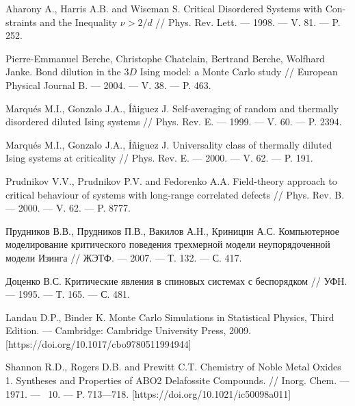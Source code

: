 \begin{thebibliography}{111}
Aharony A., Harris A.B. and Wiseman S. Critical Disordered Systems with Con-straints and the Inequality $\nu > 2/d$  // Phys. Rev. Lett. --- 1998. --- V. 81. --- P. 252.



Pierre-Emmanuel Berche, Christophe Chatelain, Bertrand Berche, Wolfhard Janke. Bond dilution in the $3D$ Ising model: a Monte Carlo study // European Physical Journal B. --- 2004. --- V. 38. --- P. 463.



Marqués M.I., Gonzalo J.A., Íñiguez J. Self-averaging of random and thermally disordered diluted Ising systems // Phys. Rev. E. --- 1999. --- V. 60. --- P. 2394.



Marqués M.I., Gonzalo J.A., Íñiguez J. Universality class of thermally diluted Ising systems at criticality // Phys. Rev. E. --- 2000. --- V. 62. --- P. 191.



Prudnikov V.V., Prudnikov P.V. and Fedorenko A.A. Field-theory approach to critical behaviour of systems with long-range correlated defects // Phys. Rev. B. --- 2000. --- V. 62. --- P. 8777.



Прудников В.В., Прудников П.В., Вакилов А.Н., Криницин А.С. Компьютерное моделирование критического поведения трехмерной модели неупорядоченной модели Изинга // ЖЭТФ. --- 2007. --- Т. 132. --- С. 417.



Доценко В.С. Критические явления в спиновых системах с беспорядком // УФН. --- 1995. --- Т. 165. --- С. 481.










Landau D.P., Binder K. Monte Carlo Simulations in Statistical Physics, Third Edition. --- Cambridge: Cambridge University Press, 2009. [https://doi.org/10.1017/cbo9780511994944]



Shannon R.D., Rogers D.B. and Prewitt C.T. Chemistry of Noble Metal Oxides 1. Syntheses and Properties of ABO2 Delafossite Compounds. // Inorg. Chem. --- 1971. --- \No\ 10. --- P. 713--–718. [https://doi.org/10.1021/ic50098a011]




\end{thebibliography}
